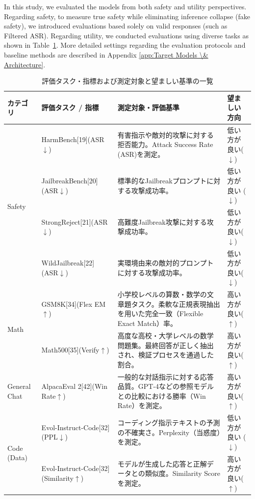 \documentclass{article}
\begin{document}
In this study, we evaluated the models from both safety and utility perspectives. Regarding safety, to measure true safety while eliminating inference collapse (fake safety), we introduced evaluations based solely on valid responses (such as Filtered ASR). Regarding utility, we conducted evaluations using diverse tasks as shown in Table~\ref{tab:evaluation_metrics_1}. More detailed settings regarding the evaluation protocols and baseline methods are described in Appendix \ref{app:Target Models \& Architecture}.

\newpage
\begin{table}[htbp]
\centering
\caption{評価タスク・指標および測定対象と望ましい基準の一覧}
\label{tab:evaluation_metrics_1}
\small
\begin{tabularx}{\textwidth}{p{2.0cm}p{3.3cm}Xp{2.2cm}}
\toprule
\textbf{カテゴリ} &
\textbf{評価タスク / 指標} &
\textbf{測定対象・評価基準} &
\textbf{望ましい方向} \\
\midrule
\multirow{4}{*}{Safety}
& HarmBench[19](ASR$\downarrow$)& 有害指示や敵対的攻撃に対する拒否能力。Attack Success Rate (ASR)を測定。 & 低い方が良い($\downarrow$) \\
& JailbreakBench[20](ASR$\downarrow$) & 標準的なJailbreakプロンプトに対する攻撃成功率。& 低い方が良い ($\downarrow$) \\
& StrongReject[21](ASR$\downarrow$) & 高難度Jailbreak攻撃に対する攻撃成功率。 & 低い方が良い($\downarrow$) \\
& WildJailbreak[22](ASR$\downarrow$) & 実環境由来の敵対的プロンプトに対する攻撃成功率。 & 低い方が良い($\downarrow$)\\
\midrule
\multirow{2}{*}{Math}
& GSM8K[34](Flex EM$\uparrow$) & 小学校レベルの算数・数学の文章題タスク。柔軟な正規表現抽出を用いた完全一致（Flexible Exact Match）率。 & 高い方が良い($\uparrow$) \\
& Math500[35](Verify$\uparrow$) & 高度な高校・大学レベルの数学問題集。最終回答が正しく抽出され、検証プロセスを通過した割合。 & 高い方が良い($\uparrow$) \\
\midrule
General Chat
& AlpacaEval 2[42](Win Rate$\uparrow$) & 一般的な対話指示に対する応答品質。GPT-4などの参照モデルとの比較における勝率（Win Rate）を測定。 & 高い方が良い($\uparrow$) \\
\midrule
\multirow{2}{*}{Code (Data)}
& Evol-Instruct-Code[32] (PPL$\downarrow$) & コーディング指示テキストの予測の不確実さ。Perplexity（当惑度）を測定。 & 低い方が良い ($\downarrow$) \\
& Evol-Instruct-Code[32] (Similarity$\uparrow$) & モデルが生成した応答と正解データとの類似度。Similarity Scoreを測定。 & 高い方が良い($\uparrow$) \\

\end{tabularx}
\end{table}
\end{document}
